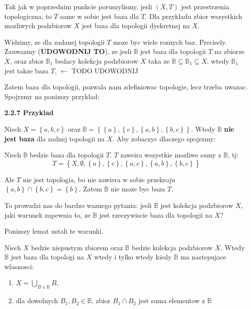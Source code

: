 \documentclass{article}
\begin{document}
\begin{tcolorbox}[colback=white!90!green,colframe=black!35!green,title=2.2.6 Lematokomentarz: Rozne bazy dla tej samej topologii]

    Tak jak w poprzednim punkcie poruszylismy, jesli $(X,T)$ jest przestrzenia topologiczna, to $T$ same w sobie jest baza dla $T$. Dla przykladu zbior wszystkich mozliwych podzbiorow $X$ jest baza dla topologii dyskretnej na $X$.

    Widzimy, ze dla zadanej topologii $T$ moze byc wiele roznych baz. Precisely. Zauwazmy (\textbf{UDOWODNIJ TO}), ze jesli $\mathbb{B}$ jest baza dla topologii $T$ na zbiorze $X$, oraz zbior $\mathbb{B}_{1}$ bedacy kolekcja podzbiorow $X$ taka ze $\mathbb{B} \subseteq \mathbb{B}_{1} \subseteq X$, wtedy $\mathbb{B}_{1}$ jest takze baza $T$. $\leftarrow$ TODO UDOWODNIJ

\end{tcolorbox}
Zatem baza dla topologii, pozwala nam zdefiniowac topologie, lecz trzeba uwazac. Spojrzmy na ponizszy przyklad:

\textbf{2.2.7 Przyklad}

Niech $X = \left\{ a,b,c \right\}$ oraz $\mathbb{B} = \left\{ \left\{ a \right\}, \left\{ c \right\}, \left\{ a,b \right\}, \left\{ b,c \right\}  \right\}$. Wtedy $\mathbb{B}$ \textbf{nie jest baza} dla zadnej topologii na $X$. Aby zobaczyc dlaczego spojrzmy:

Niech $\mathbb{B}$ bedzie baza dla topologii $T$. $T$ zaweira wszystkie mozliwe sumy z $\mathbb{B}$, tj:
$$T = \left\{X, \emptyset, \left\{ a \right\}, \left\{ c \right\}, \left\{ a,c \right\}, \left\{ a,b \right\}, \left\{ b,c \right\}    \right\}$$

Ale $T$ nie jest topologia, bo nie zawiera w sobie przekroju $\left\{ a,b \right\} \cap \left\{ b,c \right\} = \left\{ b \right\}$. Zatem $\mathbb{B}$ nie moze byc baza $T$.
\vspace{1cm}

To prowadzi nas do bardzo waznego pytania: jesli $\mathbb{B}$ jest kolekcja podzbiorow $X$, jaki warunek zapewnia to, ze $\mathbb{B}$ jest rzeczywiscie baza dla topologii na $X$?

Ponizszy lemat ustali te warunki.

\begin{tcolorbox}[colback=white!90!green,colframe=black!35!green,title=2.2.8 Lemat: Warunek na bycie baza]

    Niech $X$ bedzie niepustym zbiorem oraz $\mathbb{B}$ bedzie kolekcja podzbiorow $X$. Wtedy $\mathbb{B}$ jest baza dla topologi na $X$ wtedy i tylko wtedy kiedy $\mathbb{B}$ ma nastepujace wlasnosci:

    \begin{enumerate}[label=(\alph*)]
        \item $X = \bigcup\limits_{B \in \mathbb{B}}B$,
        \item dla dowolnych $B_{1}, B_{2} \in \mathbb{B}$, zbior $B_{1} \cap B_{2}$ jest suma elementow z $\mathbb{B}$

    \end{enumerate}

\end{tcolorbox}
\end{document}
